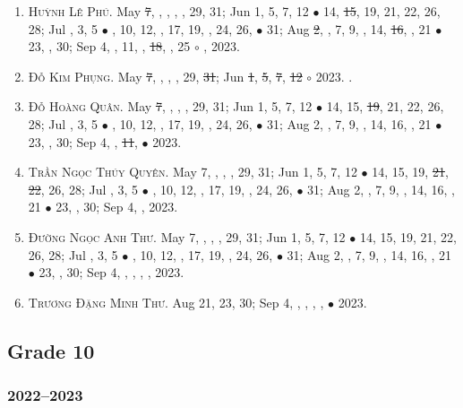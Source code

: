 \documentclass{article}
\begin{document}
\begin{enumerate}
	\item \textsc{Huỳnh Lê Phú.} May \st{7}, , , , , 29, 31; Jun 1, 5, 7, 12 $\bullet$ 14, \st{15}, 19, 21, 22, 26, 28; Jul , 3, 5 $\bullet$ , 10, 12, , 17, 19, , 24, 26,  $\bullet$ 31; Aug \st{2}, , 7, 9, , 14, \st{16}, , 21 $\bullet$ 23, , 30; Sep 4, , 11, , \st{18}, , 25 $\circ$ , 2023.
	\item \textsc{Đỗ Kim Phụng.} May \st{7}, , , , 29, \st{31}; Jun \st{1}, \st{5}, \st{7}, \st{12} $\circ$ 2023. {}. {\sf[Out]}
	\item \textsc{Đỗ Hoàng Quân.} May \st{7}, , , , 29, 31; Jun 1, 5, 7, 12 $\bullet$ 14, 15, \st{19}, 21, 22, 26, 28; Jul , 3, 5 $\bullet$ , 10, 12, , 17, 19, , 24, 26,  $\bullet$ 31; Aug 2, , 7, 9, , 14, 16, , 21 $\bullet$ 23, , 30; Sep 4, , \st{11},  $\bullet$ 2023. {\sf[Out]}
	\item \textsc{Trần Ngọc Thúy Quyên.} May 7, , , , 29, 31; Jun 1, 5, 7, 12 $\bullet$ 14, 15, 19, \st{21}, \st{22}, 26, 28; Jul , 3, 5 $\bullet$ , 10, 12, , 17, 19, , 24, 26,  $\bullet$ 31; Aug 2, , 7, 9, , 14, 16, , 21 $\bullet$ 23, , 30; Sep 4, , 2023.
	\item \textsc{Đường Ngọc Anh Thư.} May 7, , , , 29, 31; Jun 1, 5, 7, 12 $\bullet$ 14, 15, 19, 21, 22, 26, 28; Jul , 3, 5 $\bullet$ , 10, 12, , 17, 19, , 24, 26,  $\bullet$ 31; Aug 2, , 7, 9, , 14, 16, , 21 $\bullet$ 23, , 30; Sep 4, , , , , 2023.
	\item \textsc{Trương Đặng Minh Thư.} Aug 21, 23, 30; Sep 4, , , , , $\bullet$ 2023.
\end{enumerate}


\subsection{Grade 10}

\subsubsection{2022--2023}
\end{document}
